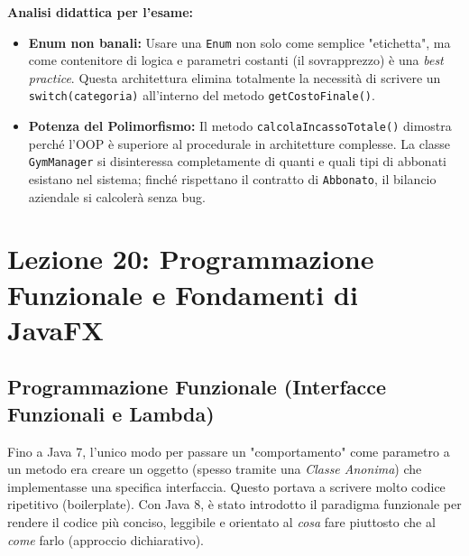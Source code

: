 \documentclass[12pt, a4paper]{article}
\begin{document}
\textbf{Analisi didattica per l'esame:}
\begin{itemize}
    \item \textbf{Enum non banali:} Usare una \texttt{Enum} non solo come semplice "etichetta", ma come contenitore di logica e parametri costanti (il sovrapprezzo) è una \textit{best practice}. Questa architettura elimina totalmente la necessità di scrivere un \texttt{switch(categoria)} all'interno del metodo \texttt{getCostoFinale()}.
    \item \textbf{Potenza del Polimorfismo:} Il metodo \texttt{calcolaIncassoTotale()} dimostra perché l'OOP è superiore al procedurale in architetture complesse. La classe \texttt{GymManager} si disinteressa completamente di quanti e quali tipi di abbonati esistano nel sistema; finché rispettano il contratto di \texttt{Abbonato}, il bilancio aziendale si calcolerà senza bug.
\end{itemize}
\newpage

\section{Lezione 20: Programmazione Funzionale e Fondamenti di JavaFX}

\subsection{Programmazione Funzionale (Interfacce Funzionali e Lambda)}
Fino a Java 7, l'unico modo per passare un "comportamento" come parametro a un metodo era creare un oggetto (spesso tramite una \textit{Classe Anonima}) che implementasse una specifica interfaccia. Questo portava a scrivere molto codice ripetitivo (boilerplate). Con Java 8, è stato introdotto il paradigma funzionale per rendere il codice più conciso, leggibile e orientato al \textit{cosa} fare piuttosto che al \textit{come} farlo (approccio dichiarativo).
\end{document}
